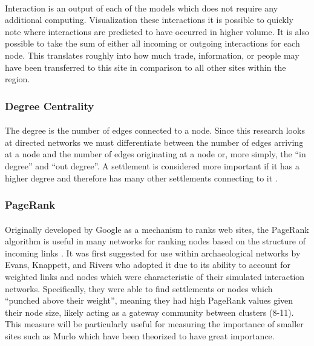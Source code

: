 \documentclass[12pt,a4paper]{thesis}
\begin{document}
\paragraph{}
Interaction is an output of each of the models which does not require any additional computing. Visualization these interactions it is possible to quickly note where interactions are predicted to have occurred in higher volume. It is also possible to take the sum of either all incoming or outgoing interactions for each node. This translates roughly into how much trade, information, or people may have been transferred to this site in comparison to all other sites within the region. 

\subsubsection{Degree Centrality}
\paragraph{}
The degree is the number of edges connected to a node. Since this research looks at directed networks we must differentiate between the number of edges arriving at a node and the number of edges originating at a node or, more simply, the ``in degree'' and ``out degree''. A settlement is considered more important if it has a higher degree and therefore has many other settlements connecting to it \citep{RodComSla06}.  





\subsubsection{PageRank}
\paragraph{}
Originally developed by Google as a mechanism to ranks web sites, the PageRank algorithm is useful in many networks for ranking nodes based on the structure of incoming links \citetext{\citealp{PageRank}; \citealp{LanMey04}}. It was first suggested for use within archaeological networks by Evans, Knappett, and Rivers \citeyearpar{KnaEvaRiv08} who adopted it due to its ability to account for weighted links and nodes which were characteristic of their simulated interaction networks. Specifically, they were able to find settlements or nodes which ``punched above their weight'', meaning they had high PageRank values given their node size, likely acting as a gateway community between clusters (8-11). This measure will be particularly useful for measuring the importance of smaller sites such as Murlo which have been theorized to have great importance.
\end{document}
